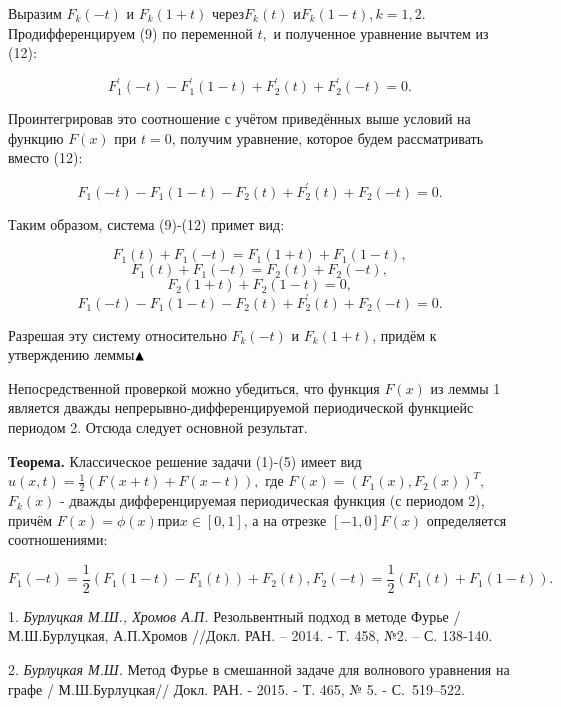 Выразим $F_{k} \left(-t\right)$ и $F_{k} \left(1+t\right)$ через$F_{k} \left(t\right)$ и$F_{k} \left(1-t\right),$$k=1,2.$ Продифференцируем  (9)  по переменной $t,$ и полученное уравнение вычтем из (12):


$$F_{1}^{{'} } \left(-t\right)-F_{1}^{{'} } \left(1-t\right)+F_{2}^{{'} } \left(t\right)+F_{2}^{{'} } \left(-t\right)=0. $$


Проинтегрировав это соотношение с учётом приведённых выше условий на функцию $F(x)$ при $t=0$, получим уравнение, которое будем рассматривать вместо (12):

\[F_{1} \left(-t\right)-F_{1} \left(1-t\right)-F_{2} \left(t\right)+F_{2}^{{'} } \left(t\right)+F_{2} \left(-t\right)=0.\]

Таким образом, система (9)-(12) примет вид:


$$F_{1} \left(t\right)+F_{1} \left(-t\right)=F_{1} \left(1+t\right)+F_{1} \left(1-t\right), $$
$$F_{1} \left(t\right)+F_{1} \left(-t\right)=F_{2} \left(t\right)+F_{2} \left(-t\right),$$
$$F_{2} \left(1+t\right)+F_{2} \left(1-t\right)=0,$$
$${F_{1} \left(-t\right)-F_{1} \left(1-t\right)-F_{2} \left(t\right)+F_{2}^{{'} } \left(t\right)+F_{2} \left(-t\right)=0.} $$


Разрешая эту систему относительно $F_{k} \left(-t\right)$ и $F_{k} \left(1+t\right)$, придём к утверждению леммы${\rm \blacktriangle }$

Непосредственной проверкой можно убедиться, что функция $F(x)$ из леммы 1 является дважды непрерывно-дифференцируемой периодической функциейс периодом 2. Отсюда следует основной результат.

\textbf{Теорема.} Классическое решение задачи (1)-(5) имеет вид $u\left(x,t\right)=\frac{1}{2} \left(F(x+t)+F\left(x-t\right)\right),$ где $F\left(x\right)=\left(F_{1} \left(x\right),F_{2} \left(x\right)\right)^{T} ,$$F_{k} \left(x\right)$ - дважды дифференцируемая периодическая функция (с периодом 2), причём $F\left(x\right)=\phi \left(x\right)$при$x\in \left[0,1\right]$, а на отрезке $\left[-1,0\right]$$F\left(x\right)$ определяется соотношениями:

\[F_{1} \left(-t\right)=\frac{1}{2} \left(F_{1} \left(1-t\right. \right)-\left. F_{1} \left(t\right)\right)+F_{2} \left(t\right),F_{2} \left(-t\right)=\frac{1}{2} \left(F_{1} \left(t\right. \right)+\left. F_{1} \left(1-t\right)\right).\]


\litlist

1. {\it Бурлуцкая М.Ш., Хромов А.П.} Резольвентный подход в методе Фурье / М.Ш.Бурлуцкая, А.П.Хромов //Докл. РАН. -- 2014. - Т. 458, №2. -- С. 138-140.

2. {\it Бурлуцкая М.Ш.} Метод Фурье в смешанной задаче для волнового уравнения на графе / М.Ш.Бурлуцкая// Докл. РАН. - 2015. - Т. 465, № 5. - С.~519--522.
